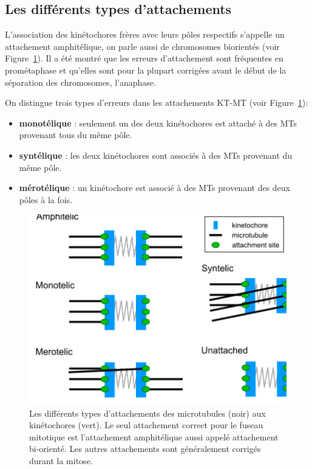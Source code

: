 \documentclass[12pt,a4paper,twoside,openright]{book}
\begin{document}
\subsection{Les différents types
d'attachements}\label{sec:attachments-type}

L'association des kinétochores frères avec leurs pôles respectifs
s'appelle un attachement amphitélique, on parle aussi de chromosomes
biorientés (voir Figure~\ref{fig:attachements}). Il a été montré que les
erreurs d'attachement sont fréquentes en prométaphase et qu'elles sont
pour la plupart corrigées avant le début de la séparation des
chromosomes, l'anaphase.

On distingue trois types d'erreurs dans les attachements KT-MT (voir
Figure~\ref{fig:attachements}):

\begin{itemize}
\item
  \textbf{monotélique} : seulement un des deux kinétochores est attaché
  à des MTs provenant tous du même pôle.
\item
  \textbf{syntélique} : les deux kinétochores sont associés à des MTs
  provenant du même pôle.
\item
  \textbf{mérotélique} : un kinétochore est associé à des MTs provenant
  des deux pôles à la fois.
\end{itemize}

\begin{figure}[htbp]
\centering
\includegraphics{figures/intro/attachments.png}
\caption[Les différents types d'attachements des microtubules aux kinétochores]{\label{fig:attachements}Les
différents types d'attachements des microtubules (noir) aux kinétochores
(vert). Le seul attachement correct pour le fuseau mitotique est
l'attachement amphitélique aussi appelé attachement bi-orienté. Les
autres attachements sont généralement corrigés durant la mitose.}
\end{figure}
\end{document}
